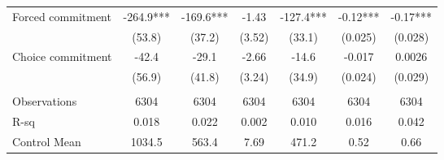 \begin{tabular}{lcccccc}
\midrule
\midrule
Forced commitment  & -264.9*** & -169.6*** & -1.43 & -127.4*** & -0.12*** & -0.17*** \\
      & (53.8) & (37.2) & (3.52) & (33.1) & (0.025) & (0.028) \\
Choice commitment & -42.4 & -29.1 & -2.66 & -14.6 & -0.017 & 0.0026 \\
      & (56.9) & (41.8) & (3.24) & (34.9) & (0.024) & (0.029) \\
      &       &       &       &       &       &  \\
\midrule
Observations & 6304  & 6304  & 6304  & 6304  & 6304  & 6304 \\
R-sq  & 0.018 & 0.022 & 0.002 & 0.010 & 0.016 & 0.042 \\
Control Mean & 1034.5 & 563.4 & 7.69  & 471.2 & 0.52  & 0.66 \\
\bottomrule
\bottomrule
\end{tabular}%
